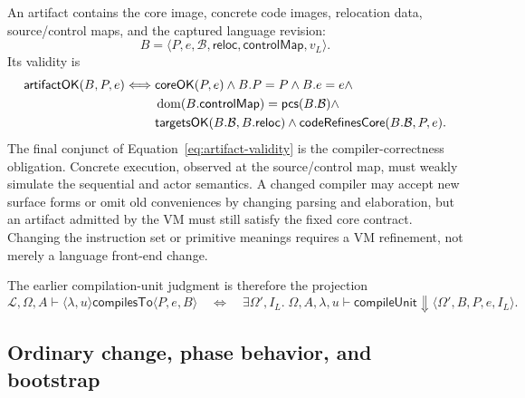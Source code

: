 An artifact contains the core image, concrete code images, relocation data,
source/control maps, and the captured language revision:
\begin{equation}\label{eq:artifact-domain}
 B=\langle P,e,\mathcal B,\mathsf{reloc},\mathsf{controlMap},v_L\rangle.
\end{equation}
Its validity is
\begin{equation}\label{eq:artifact-validity}
\begin{split}
 \mathsf{artifactOK}(B,P,e)\Longleftrightarrow{}&
 \mathsf{coreOK}(P,e)\land B.P=P\land B.e=e\land\\
 &\mathop{\mathrm{dom}}(B.\mathsf{controlMap})=\mathsf{pcs}(B.\mathcal B)\land\\
 &\mathsf{targetsOK}(B.\mathcal B,B.\mathsf{reloc})\land
 \mathsf{codeRefinesCore}(B.\mathcal B,P,e).
\end{split}
\end{equation}
The final conjunct of Equation~\eqref{eq:artifact-validity} is the
compiler-correctness obligation.  Concrete execution, observed at the
source/control map, must weakly simulate the sequential and actor semantics.
A changed compiler may accept new surface forms or omit old conveniences by
changing parsing and elaboration, but an artifact admitted by the VM must
still satisfy the fixed core contract.  Changing the instruction set or
primitive meanings requires a VM refinement, not merely a language front-end
change.

The earlier compilation-unit judgment is therefore the projection
\begin{equation}\label{eq:compilation-unit-projection}
 \mathcal L,\Omega,A\vdash\langle\lambda,u\rangle
      \mathsf{compilesTo}\langle P,e,B\rangle
 \quad\Longleftrightarrow\quad
 \exists\Omega',I_L.\;
 \Omega,A,\lambda,u\vdash\mathsf{compileUnit}
      \Downarrow\langle\Omega',B,P,e,I_L\rangle.
\end{equation}

\subsection{Ordinary change, phase behavior, and bootstrap}
\label{sec:metacircular-change}

